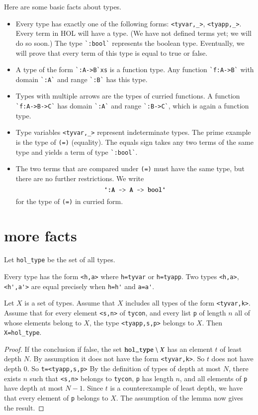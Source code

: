 Here are some basic facts about types.
\begin{itemize}
\item Every type has exactly one of the following forms:
\verb!<tyvar,_>!, \verb!<tyapp,_>!.
Every term in HOL will have a type. (We have not defined terms yet; we will do so soon.)
The type \verb!`:bool`! represents the boolean type.  Eventually, we will prove that every term of this type is equal to true or false.
\item A type of the form \verb!`:A->B`xs! is a function type.  Any function \verb!`f:A->B`! with domain \verb!`:A`! and range \verb!`:B`! has this type.
\item Types with multiple arrows are the types of curried functions.  A function \verb!`f:A->B->C`! has domain \verb!`:A`! and range \verb!`:B->C`!, which is again a function type.
\item Type variables \verb!<tyvar,_>! represent indeterminate types.   The prime example is the type of \verb!(=)! (equality).  The equals sign takes any two terms of the same type and yields a term of type \verb!`:bool`!.
\item The two terms that are compared under \verb!(=)! must have the same type, but there are no further restrictions.  We write
$$
\verb!`:A -> A -> bool`!
$$
for the type of \verb!(=)! in curried form.
\end{itemize}



\section{more facts}

Let \verb!hol_type! be the set of all types.

Every type has the form \verb!<h,a>! where \verb!h=tyvar! or \verb!h=tyapp!.  Two types \verb!<h,a>!, \verb!<h',a'>! are equal precisely when \verb!h=h'! and \verb!a=a'!.

\begin{lemma}[induction]  Let $X$ is a set of types. Assume that $X$ includes all types of the form \verb!<tyvar,k>!.  Assume that for every element \verb!<s,n>! of \verb!tycon!, and every list \verb!p! of length $n$ all of whose elements belong to $X$, the type \verb!<tyapp,s,p>! belongs to $X$.  Then \verb!X=hol_type!.
\end{lemma}

\begin{proof} If the conclusion if false, the set $\verb!hol_type!\setminus X$ has an element $t$ of least depth $N$.  By assumption it does not have the form \verb!<tyvar,k>!.  So $t$ does not have depth $0$.  So \verb!t=<tyapp,s,p>!   By the definition of types of depth at most $N$, there exists $n$ such that \verb!<s,n>! belongs to \verb!tycon!, \verb!p! has length $n$, and all elements of \verb!p! have depth at most $N-1$.  Since $t$ is a counterexample of least depth, we have that every element of \verb!p! belongs to $X$.  The assumption of the lemma now gives the result.
\end{proof}



